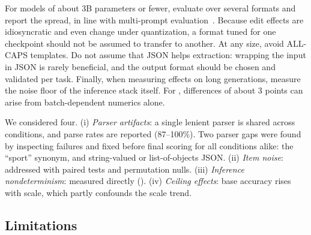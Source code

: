  For models of about 3B parameters or fewer, evaluate over several formats and report the spread, in line with multi-prompt evaluation~\cite{mizrahi2024state}. Because edit effects are idiosyncratic and even change under quantization, a format tuned for one checkpoint should not be assumed to transfer to another. At any size, avoid ALL-CAPS templates. Do not assume that JSON helps extraction: wrapping the input in JSON is rarely beneficial, and the output format should be chosen and validated per task. Finally, when measuring effects on long generations, measure the noise floor of the inference stack itself. For \ifeval, differences of about 3 points can arise from batch-dependent numerics alone.

 We considered four. (i) \emph{Parser artifacts}: a single lenient parser is shared across conditions, and parse rates are reported (87--100\%). Two parser gaps were found by inspecting failures and fixed before final scoring for all conditions alike: the ``sport'' synonym, and string-valued or list-of-objects JSON. (ii) \emph{Item noise}: addressed with paired tests and permutation nulls. (iii) \emph{Inference nondeterminism}: measured directly (). (iv) \emph{Ceiling effects}: base accuracy rises with scale, which partly confounds the scale trend.

\subsection{Limitations}
\label{sec:limitations}

